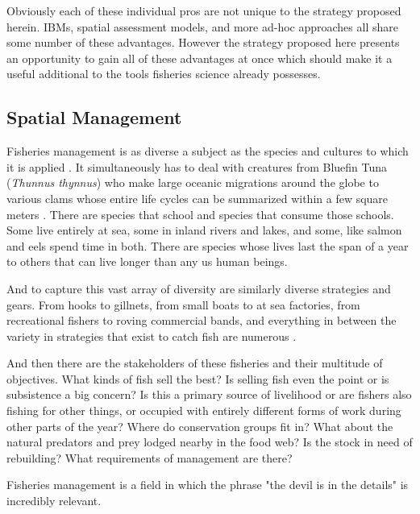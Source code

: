 \documentclass[11pt]{article}
\begin{document}
\begin{enumerate}
\end{enumerate}

Obviously each of these individual pros are not unique to the strategy proposed herein. IBMs, spatial assessment models, and more ad-hoc approaches all share some number of these advantages. However the strategy proposed here presents an opportunity to gain all of these advantages at once which should make it a useful additional to the tools fisheries science already possesses. 
\newpage



\subsection{Spatial Management}\label{spatial_management}

Fisheries management is as diverse a subject as the species and cultures to which it is applied \citep{waltersmartell} \citep{king}. It simultaneously has to deal with creatures from Bluefin Tuna (\textit{Thunnus thynnus}) who make large oceanic migrations around the globe to various clams whose entire life cycles can be summarized within a few square meters \citep{prince2010}. There are species that school and species that consume those schools. Some live entirely at sea, some in inland rivers and lakes, and some, like salmon and eels spend time in both. There are species whose lives last the span of a year to others that can live longer than any us human beings. 

And to capture this vast array of diversity are similarly diverse strategies and gears. From hooks to gillnets, from small boats to at sea factories, from recreational fishers to roving commercial bands, and everything in between the variety in strategies that exist to catch fish are numerous \citep{waltersmartell} \citep{king}. 

And then there are the stakeholders of these fisheries and their multitude of objectives. What kinds of fish sell the best? Is selling fish even the point or is subsistence a big concern? Is this a primary source of livelihood or are fishers also fishing for other things, or occupied with entirely different forms of work during other parts of the year? Where do conservation groups fit in? What about the natural predators and prey lodged nearby in the food web? Is the stock in need of rebuilding? What requirements of management are there? \citep{waltersmartell} \citep{king}

Fisheries management is a field in which the phrase "the devil is in the details" is incredibly relevant. \newline
\end{document}
